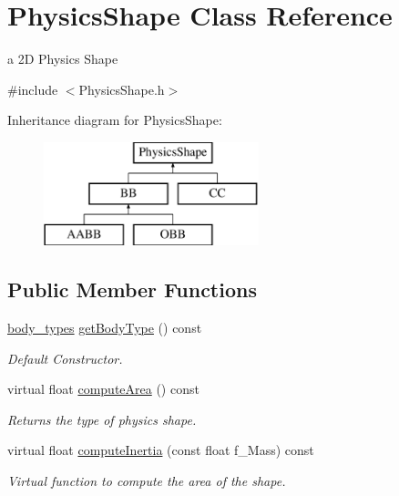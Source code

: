 \hypertarget{class_physics_shape}{\section{Physics\+Shape Class Reference}
\label{class_physics_shape}
}


a 2\+D Physics Shape  




{\ttfamily \#include $<$Physics\+Shape.\+h$>$}

Inheritance diagram for Physics\+Shape\+:\begin{figure}[H]
\begin{center}
\leavevmode
\includegraphics[height=3.000000cm]{class_physics_shape}
\end{center}
\end{figure}
\subsection*{Public Member Functions}
\begin{DoxyCompactItemize}
\item 
\hypertarget{class_physics_shape_af921c5335f89dd6c5e98bdceddb6b2c6}{\hyperlink{_physics_shape_8h_a20d894c0e61b699e6a53f0871418ea46}{body\+\_\+types} \hyperlink{class_physics_shape_af921c5335f89dd6c5e98bdceddb6b2c6}{get\+Body\+Type} () const }\label{class_physics_shape_af921c5335f89dd6c5e98bdceddb6b2c6}

\begin{DoxyCompactList}\small\item\em Default Constructor. \end{DoxyCompactList}\item 
\hypertarget{class_physics_shape_ae7bd37cc6d1c414e4d92649dba3cd791}{virtual float \hyperlink{class_physics_shape_ae7bd37cc6d1c414e4d92649dba3cd791}{compute\+Area} () const }\label{class_physics_shape_ae7bd37cc6d1c414e4d92649dba3cd791}

\begin{DoxyCompactList}\small\item\em Returns the type of physics shape. \end{DoxyCompactList}\item 
\hypertarget{class_physics_shape_a5e557a41a6dc5e77dfdf8e79a3d816d6}{virtual float \hyperlink{class_physics_shape_a5e557a41a6dc5e77dfdf8e79a3d816d6}{compute\+Inertia} (const float f\+\_\+\+Mass) const }\label{class_physics_shape_a5e557a41a6dc5e77dfdf8e79a3d816d6}

\begin{DoxyCompactList}\small\item\em Virtual function to compute the area of the shape. \end{DoxyCompactList}\end{DoxyCompactItemize}
